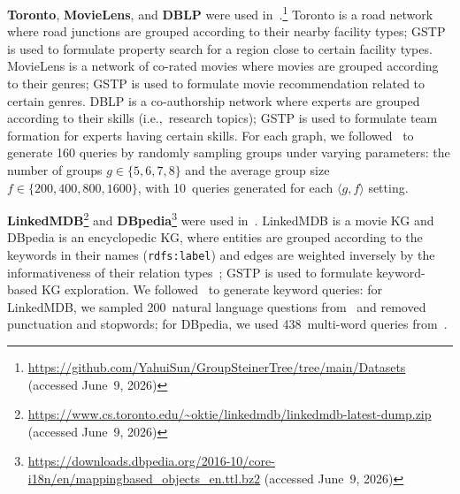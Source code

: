 \textbf{Toronto}, \textbf{MovieLens}, and \textbf{DBLP} were used in~\cite{ImprovAPP}.\footnote{\url{https://github.com/YahuiSun/GroupSteinerTree/tree/main/Datasets} (accessed June~9, 2026)}
Toronto is a road network where road junctions are grouped according to their nearby facility types; GSTP is used to formulate property search for a region close to certain facility types.
MovieLens is a network of co-rated movies where movies are grouped according to their genres; GSTP is used to formulate movie recommendation related to certain genres.
DBLP is a co-authorship network where experts are grouped according to their skills (i.e.,~research topics); GSTP is used to formulate team formation for experts having certain skills.
For each graph, we followed~\cite{PrunedDP} to generate 160 queries by randomly sampling groups under varying parameters: the number of groups $g\in\{5,6,7,8\}$ and the average group size $f\in\{200,400,800,1600\}$, with 10~queries generated for each $\langle g,f\rangle$ setting.

\textbf{LinkedMDB}\footnote{\url{https://www.cs.toronto.edu/~oktie/linkedmdb/linkedmdb-latest-dump.zip} (accessed June~9, 2026)} and \textbf{DBpedia}\footnote{\url{https://downloads.dbpedia.org/2016-10/core-i18n/en/mappingbased_objects_en.ttl.bz2} (accessed June~9, 2026)} were used in~\cite{KeyKG}. LinkedMDB is a movie KG and DBpedia is an encyclopedic KG, where entities are grouped according to the keywords in their names (\texttt{rdfs:label}) and edges are weighted inversely by the informativeness of their relation types~\cite{IW_setting}; GSTP is used to formulate keyword-based KG exploration.
We followed~\cite{KeyKG} to generate keyword queries: for LinkedMDB, we sampled 200~natural language questions from~\cite{KS_Lkmdb} and removed punctuation and stopwords; for DBpedia, we used 438~multi-word queries from~\cite{KS_DBP}.

